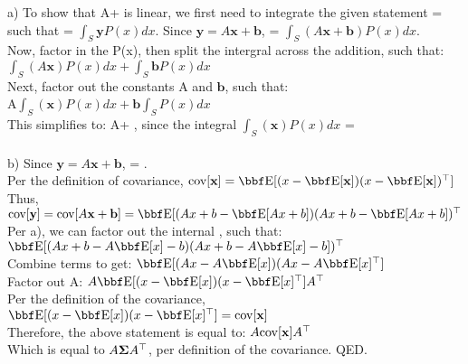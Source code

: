 \documentclass[12pt,letterpaper]{hmcpset}
\begin{document}
\begin{solution}
    a) To show that A\EE[\xx] + \bb  is linear, we first need to integrate the given statement \EE[\yy] = \EE[A\xx + \bb]  such that \EE[\yy] =  $\int_{S} \mathbf{y} P(x) dx$. Since $\mathbf{y} = A\mathbf{x} + \mathbf{b}$, \EE[\yy] =  $\int_{S} (A\mathbf{x} + \mathbf{b}) P(x) dx$.\\ 
    
    Now, factor in the P(x), then split the intergral across the addition, such that: \\
                                          $\int_{S} (A\mathbf{x}) P(x) dx+ \int_{S} \mathbf{b} P(x) dx$\\
    Next, factor out the constants A and  $\mathbf{b}$, such that:\\ A$\int_{S} (\mathbf{x}) P(x) dx+ \mathbf{b} \int_{S}  P(x) dx$ \\
    This simplifies to: A\EE[\xx] + \bb, since the integral $\int_{S} (\mathbf{x}) P(x) dx$ = \EE[\xx]
   \\
   \\
   b) Since $\mathbf{y} = A\mathbf{x} + \mathbf{b}$,  \cov[\yy] = \cov[A\xx + \bb]. \\
   Per the definition of covariance, $ \cov[\xx] = \EE[(x - \EE[\xx])(x - \EE[\xx])^\T  ] $ \\
   Thus, $\cov[\yy] = \cov[A\xx + \bb] =  \EE[(Ax + b - \EE[Ax +b])( Ax + b - \EE[Ax + b])^\T $ \\
   Per a), we can factor out the internal \EE[Ax+b], such that: $\EE[(Ax + b - A\EE[x] - b)( Ax + b - A\EE[x] - b])^\T $\\
   Combine terms to get: $\EE[(Ax - A\EE[x])(Ax - A\EE[x]^\T] $  \\
   Factor out A: $A \EE[(x - \EE[x])(x - \EE[x]^\T] A^\T $  \\
   Per the definition of the covariance, $\EE[(x - \EE[x])(x - \EE[x]^\T] = \cov[\xx]$ \\
   Therefore, the above statement is equal to: $ A {\hbox{cov}}[{\bf x}] A^\top $ \\
   Which is equal to $A\hbox{\boldmath$\Sigma$} A^\top $, per definition of the covariance. QED.
 
   	
     					

\end{solution}
\end{document}
